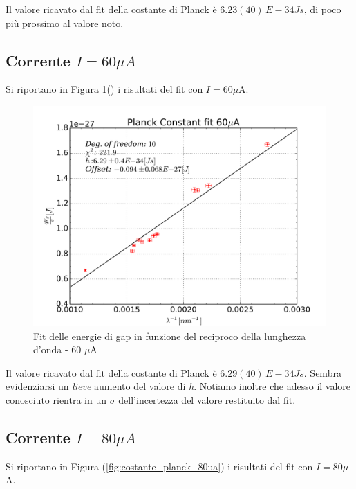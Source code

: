 \documentclass[journal, a4paper]{IEEEtran}
\begin{document}
Il valore ricavato dal fit della costante di Planck è $6.23(40) \, E-34 \si{Js}$, di poco più prossimo al valore noto.

\subsection{Corrente $I = 60 \mu \si{A}$} 

Si riportano in Figura \ref{fig:costante_planck_60ua}() i risultati del fit con $I = 60 \mu $A.

\begin{figure}
\centering
\includegraphics[width=0.9\linewidth]{./costante_planck_60ua}
\caption{Fit delle energie di gap in funzione del reciproco della lunghezza d'onda - 60 $\mu$A}
\label{fig:costante_planck_60ua}
\end{figure}

Il valore ricavato dal fit della costante di Planck è $6.29(40) \, E-34 \si{Js}$. Sembra evidenziarsi un \textit{lieve} aumento del valore di \textit{h}. Notiamo inoltre che adesso il valore conosciuto rientra in un $\sigma$ dell'incertezza del valore restituito dal fit.

\subsection{Corrente $I = 80 \mu \si{A}$}


Si riportano in Figura (\ref{fig:costante_planck_80ua}) i risultati del fit con $I = 80 \mu $A.
\end{document}
